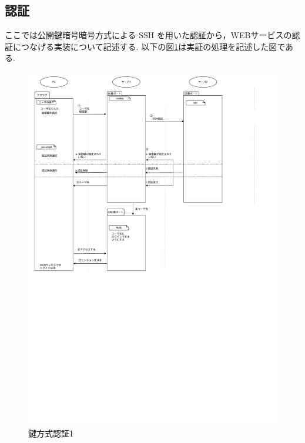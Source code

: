     \subsection{認証}
        ここでは公開鍵暗号暗号方式による SSH を用いた認証から，WEBサービスの認証につなげる実装について記述する.
        以下の図\ref{certification}は実証の処理を記述した図である.
        \begin{figure}[H]
            \includegraphics[width=13cm]{fig/chapter3/certification/key_certify.pdf}
            \caption{鍵方式認証1}
            \label{certification}
        \end{figure}



